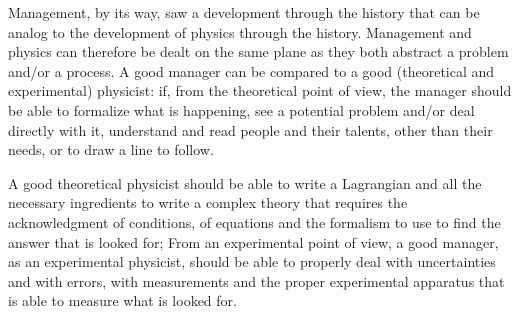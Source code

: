 \documentclass{article}
\begin{document}
Management, by its way, saw a development through the history that can be analog to the development of physics through the history. Management and physics can therefore be dealt on the same plane as they both abstract a problem and/or a process. A good manager can be compared to a good (theoretical and experimental) physicist:
if, from the theoretical point of view, the manager should be able to formalize what is happening, see a potential problem and/or deal directly with it, understand and read people and their talents, other than their needs, or to draw a line to follow. 

A good theoretical physicist should be able to write a Lagrangian and all the necessary ingredients to write a complex theory that requires the acknowledgment of conditions, of equations and the formalism to use to find the answer that is looked for; From an experimental point of view, a good manager, as an experimental physicist, should be able to properly deal with uncertainties and with errors, with measurements and the proper experimental apparatus that is able to measure what is looked for.
\end{document}
